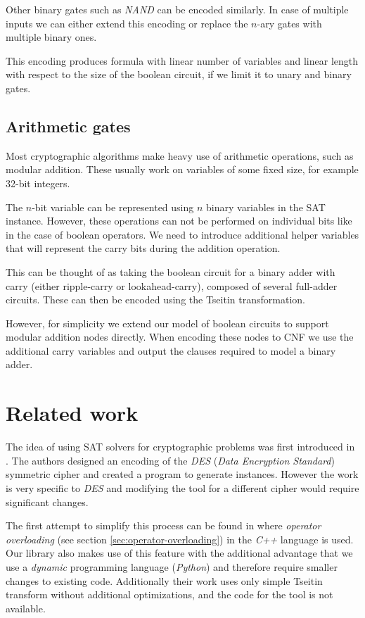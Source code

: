 Other binary gates such as \emph{NAND} can be encoded similarly.
In case of multiple inputs we can either extend this encoding or replace the $n$-ary gates with multiple binary ones.

This encoding produces formula with linear number of variables and linear length with respect to the size of the boolean circuit, if we limit it to unary and binary gates.

\subsection{Arithmetic gates}
Most cryptographic algorithms make heavy use of arithmetic operations, such as modular addition.
These usually work on variables of some fixed size, for example 32-bit integers.

The $n$-bit variable can be represented using $n$ binary variables in the SAT instance.
However, these operations can not be performed on individual bits like in the case of boolean operators.
We need to introduce additional helper variables that will represent the carry bits during the addition operation.

This can be thought of as taking the boolean circuit for a binary adder with carry (either ripple-carry or lookahead-carry), composed of several full-adder circuits.
These can then be encoded using the Tseitin transformation.

However, for simplicity we extend our model of boolean circuits to support modular addition nodes directly.
When encoding these nodes to CNF we use the additional carry variables and output the clauses required to model a binary adder.

\section{Related work}
\label{sec:related-work}
The idea of using SAT solvers for cryptographic problems was first introduced in \cite{massacci2000logical}.
The authors designed an encoding of the \emph{DES} (\emph{Data Encryption Standard}) symmetric cipher and created a program to generate instances.
However the work is very specific to \emph{DES} and modifying the tool for a different cipher would require significant changes.

The first attempt to simplify this process can be found in \cite{jovanovic2005logical} where \emph{operator overloading} (see section \ref{sec:operator-overloading}) in the \emph{C++} language is used.
Our library also makes use of this feature with the additional advantage that we use a \emph{dynamic} programming language (\emph{Python}) and therefore require smaller changes to existing code.
Additionally their work uses only simple Tseitin transform without additional optimizations, and the code for the tool is not available.

